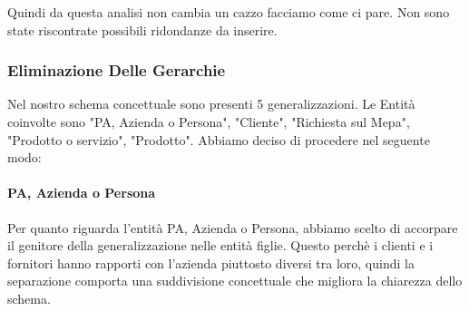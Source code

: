 \begin{table}[H]
\centering
\caption{Costo Operazioni senza Ridondanza}
\label{my-label}
\end{table}

\newline Quindi da questa analisi non cambia un cazzo facciamo come ci pare.
Non sono state riscontrate possibili ridondanze da inserire.


\newpage
\subsubsection{Eliminazione Delle Gerarchie}

Nel nostro schema concettuale sono presenti 5 generalizzazioni. Le Entità coinvolte sono "PA, Azienda o Persona", "Cliente", "Richiesta sul Mepa", "Prodotto o servizio", "Prodotto".
\newline
Abbiamo deciso di procedere nel seguente modo:

\paragraph{PA, Azienda o Persona}
Per quanto riguarda l'entità PA, Azienda o Persona, abbiamo scelto di accorpare il genitore della generalizzazione nelle entità figlie. Questo perchè i clienti e i fornitori hanno rapporti con l'azienda piuttosto diversi tra loro, quindi la separazione comporta una suddivisione concettuale che migliora la chiarezza dello schema.
